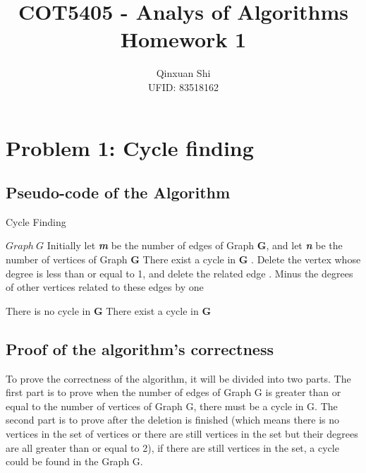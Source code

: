 \documentclass[]{article}
\title{\Huge COT5405 - Analys of Algorithms \\ Homework 1}
\author{Qinxuan Shi \\ UFID: 83518162}
\date{}
\begin{document}
	
	\maketitle
	\clearpage
	
	\section{Problem 1: Cycle finding}
	\subsection{Pseudo-code of the Algorithm}
		\begin{algorithm}  
			\caption{Cycle Finding}  
			\begin{algorithmic} 
				\Require $Graph\ G$  
				\Ensure
				\State Initially let \emph{\textbf{m}} be the number of edges of Graph \textbf{G}, and let \emph{\textbf{n}} be the number of vertices of Graph \textbf{G}
					\State There exist a cycle in \textbf{G}
				\Else
						. Delete the vertex whose degree is less than or equal to 1, and delete the related edge
						. Minus the degrees of other vertices related to these edges by one
					\EndWhile

					\State {}
						\State There is no cycle in \textbf{G}
					\Else
						\State There exist a cycle in \textbf{G}
					\EndIf
				\EndIf
			\end{algorithmic}  
		\end{algorithm} 
		
	\subsection{Proof of the algorithm's correctness}
	
	To prove the correctness of the algorithm, it will be divided into two parts. The first part is to prove when the number of edges of Graph G is greater than or equal to the number of vertices of Graph G, there must be a cycle in G. The second part is to prove after the deletion is finished (which means there is no vertices in the set of vertices or there are still vertices in the set but their degrees are all greater than or equal to 2), if there are still vertices in the set, a cycle could be found in the Graph G.   \\
	
\end{document}
